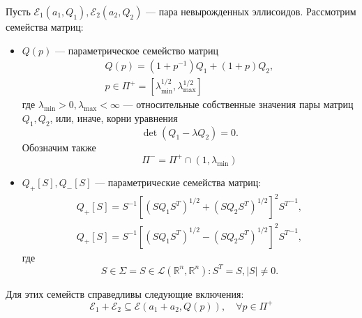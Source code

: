 \begin{theorem}
    Пусть \( \mathcal{E}_1(a_1, Q_1), \mathcal{E}_2(a_2, Q_2) \) --- пара невырожденных эллисоидов.
     Рассмотрим семейства матриц:
    \begin{itemize}
        \item \( Q(p) \) --- параметрическое семейство матриц
        \begin{equation*}
            \begin{gathered}
                Q(p) = (1 + p^{-1})Q_1 + (1 + p) Q_2,\\
                p \in \Pi^+ = \left[ \lambda_{\mathrm{min}}^{1/2}, \lambda_{\mathrm{max}}^{1/2} 
                 \right]
            \end{gathered}
        \end{equation*}
        где \( \lambda_{\mathrm{min}} > 0, \lambda_{\mathrm{max}} < \infty \) --- относительные
         собственные
        значения пары матриц \( Q_1, Q_2 \), или, иначе, корни уравнения
        \begin{equation*}
            \det (Q_1 - \lambda Q_2) = 0.
        \end{equation*}
        Обозначим также
        \begin{equation*}
            \Pi^- = \Pi^+ \cap(1, \lambda_{\mathrm{min}})
        \end{equation*}
        \item \( Q_+[S], Q_-[S] \) --- параметрические семейства матриц:
        \begin{equation*}
            \begin{gathered}
                Q_+[S] = S^{-1}[(S Q_1 S^T)^{1/2} + (S Q_2 S^T)^{1/2}]^2 {S^T}^{-1}, \\
                Q_+[S] = S^{-1}[(S Q_1 S^T)^{1/2} - (S Q_2 S^T)^{1/2}]^2 {S^T}^{-1},
            \end{gathered}
        \end{equation*}
        где
        \begin{equation*}
            S \in \Sigma = {S \in \mathcal{L}(\mathbb{R}^n, \mathbb{R}^n): S^T = S, |S| \ne 0}.
        \end{equation*}
    \end{itemize}
    Для этих семейств справедливы следующие включения:
    \begin{equation}
        \mathcal{E}_1 + \mathcal{E}_2 \subseteq \mathcal{E}(a_1 + a_2, Q(p)), \quad \forall p \in \Pi^+
    \end{equation}
    \begin{equation}

\end{equation}
\end{theorem}
